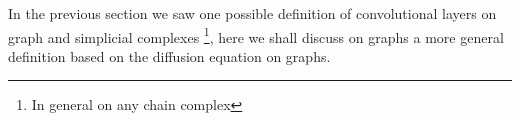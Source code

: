 \documentclass[../3.tex]{subfiles}
\begin{document}
   In the previous section we saw one possible definition of convolutional layers on graph and simplicial complexes \footnote{In general on any chain complex},
   here we shall discuss on graphs a more general definition based on the diffusion equation on graphs.
\end{document}
